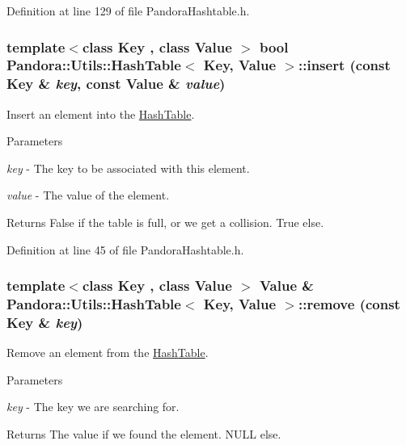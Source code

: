 Definition at line 129 of file PandoraHashtable.h.\hypertarget{classPandora_1_1Utils_1_1HashTable_a57a06b0dde67656b86fd91c04e9a4fbf}{
\subsubsection[{insert}]{\setlength{\rightskip}{0pt plus 5cm}template$<$class Key , class Value $>$ bool {\bf Pandora::Utils::HashTable}$<$ Key, Value $>$::insert (const Key \& {\em key}, \/  const Value \& {\em value})}}
\label{classPandora_1_1Utils_1_1HashTable_a57a06b0dde67656b86fd91c04e9a4fbf}


Insert an element into the \hyperlink{classPandora_1_1Utils_1_1HashTable}{HashTable}. 
\begin{DoxyParams}{Parameters}
\item[{\em key}]-\/ The key to be associated with this element. \item[{\em value}]-\/ The value of the element. \end{DoxyParams}
\begin{DoxyReturn}{Returns}
False if the table is full, or we get a collision. True else. 
\end{DoxyReturn}


Definition at line 45 of file PandoraHashtable.h.\hypertarget{classPandora_1_1Utils_1_1HashTable_ad5c2861d3938bb8e6e4b21bbf7fde6df}{
\subsubsection[{remove}]{\setlength{\rightskip}{0pt plus 5cm}template$<$class Key , class Value $>$ Value \& {\bf Pandora::Utils::HashTable}$<$ Key, Value $>$::remove (const Key \& {\em key})}}
\label{classPandora_1_1Utils_1_1HashTable_ad5c2861d3938bb8e6e4b21bbf7fde6df}


Remove an element from the \hyperlink{classPandora_1_1Utils_1_1HashTable}{HashTable}. 
\begin{DoxyParams}{Parameters}
\item[{\em key}]-\/ The key we are searching for. \end{DoxyParams}
\begin{DoxyReturn}{Returns}
The value if we found the element. NULL else. 
\end{DoxyReturn}


